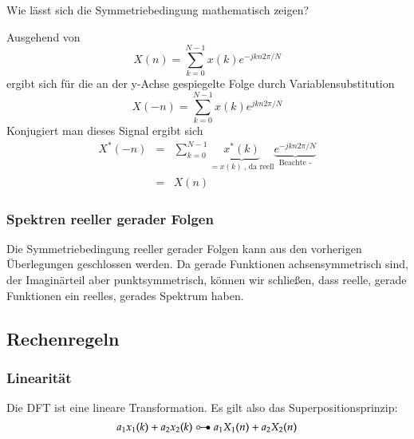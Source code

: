 Wie lässt sich die Symmetriebedingung mathematisch zeigen?

Ausgehend von
\[
    X(n) = \sum_{k = 0}^{N-1} x(k) e^{-jkn2\pi/N}
\]
ergibt sich für die an der y-Achse gespiegelte Folge durch Variablensubstitution
\[
    X(-n) = \sum_{k = 0}^{N-1} x(k) e^{jkn2\pi/N}
\]
Konjugiert man dieses Signal ergibt sich
\begin{eqnarray}
    X^{\ast}(-n)  &  =  & \sum_{k = 0}^{N-1} \underbrace{x^{\ast}(k)}_{=x(k)\:\mbox{, da reell}}
    \underbrace{e^{-jkn2\pi/N}}_{\mbox{Beachte -}}\\
                  &  =  & X(n)
\end{eqnarray}

\subsubsection{Spektren reeller gerader Folgen}
Die Symmetriebedingung reeller gerader Folgen kann aus den vorherigen
Überlegungen geschlossen werden. Da gerade Funktionen achsensymmetrisch
sind, der Imaginärteil aber punktsymmetrisch, können wir schließen, dass
reelle, gerade Funktionen ein reelles, gerades Spektrum haben.





\subsection{Rechenregeln}
\subsubsection{Linearität}
Die DFT ist eine lineare Transformation. Es gilt also das
Superpositionsprinzip:
\begin{equation}\label{eq:DFT:Linearitaet}
  a_1 x_1(k) + a_2 x_2(k) \HinTrans a_1 X_1(n) + a_2 X_2(n)
\end{equation}


